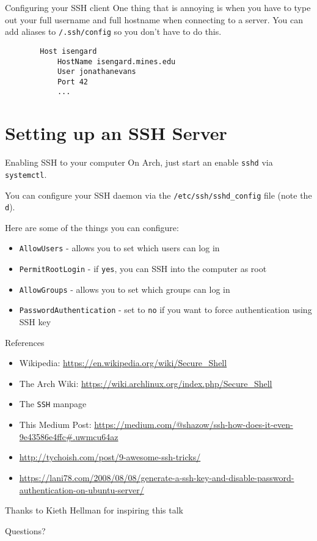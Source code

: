\documentclass{lug}
\newcommand{\textapprox}{\raisebox{0.5ex}{\texttildelow}}
\begin{document}
\begin{frame}[fragile]{Configuring your SSH client}
    One thing that is annoying is when you have to type out your full username
    and full hostname when connecting to a server. You can add aliases to
    \texttt{\textapprox/.ssh/config} so you don't have to do this.

    \begin{verbatim}
        Host isengard
            HostName isengard.mines.edu
            User jonathanevans
            Port 42
            ...
    \end{verbatim}
\end{frame}

\section{Setting up an SSH Server}
\begin{frame}{Enabling SSH to your computer}
    On Arch, just start an enable \texttt{sshd} via \texttt{systemctl}.

    You can configure your SSH daemon via the \texttt{/etc/ssh/sshd\_config}
    file (note the \texttt{d}).

    Here are some of the things you can configure:
    \begin{itemize}
        \item \texttt{AllowUsers} - allows you to set which users can log in
        \item \texttt{PermitRootLogin} - if \texttt{yes}, you can SSH into the
            computer as root
        \item \texttt{AllowGroups} - allows you to set which groups can log in
        \item \texttt{PasswordAuthentication} - set to \texttt{no} if you want
            to force authentication using SSH key
    \end{itemize}
\end{frame}

\begin{frame}{References}
    \begin{itemize}
        \singlespacing\fontsize{10}{10}\selectfont
    \item Wikipedia: \url{https://en.wikipedia.org/wiki/Secure_Shell}
    \item The Arch Wiki:
        \url{https://wiki.archlinux.org/index.php/Secure_Shell}
    \item The \texttt{SSH} manpage
    \item This Medium Post:
        \url{https://medium.com/@shazow/ssh-how-does-it-even-9e43586e4ffc\#.uwmcu64az}
    \item \url{http://tychoish.com/post/9-awesome-ssh-tricks/}
    \item
        \url{https://lani78.com/2008/08/08/generate-a-ssh-key-and-disable-password-authentication-on-ubuntu-server/}
\end{itemize}
Thanks to Kieth Hellman for inspiring this talk
\end{frame}

\begin{frame}[standout]
    \Huge
    Questions?
\end{frame}
\end{document}
